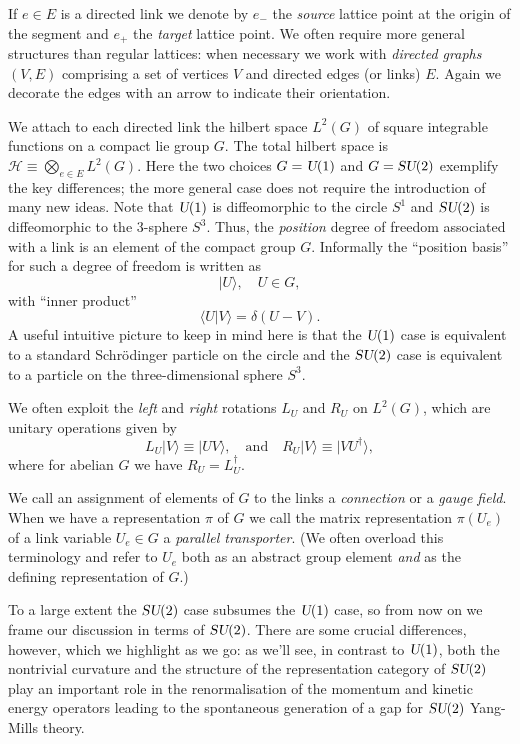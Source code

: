 \documentclass[twocolumn,lengthcheck,superscriptaddress]{revtex4-1}
\def\su2{\textsl{SU}(2)}
\def\uone{\textsl{U}(1)}
\theoremstyle{definition}
\theoremstyle{remark}
\begin{document}
If $e\in E$ is a directed link we denote by $e_-$ the \emph{source} lattice point at the origin of the segment and $e_+$ the \emph{target} lattice point. We often require more general structures than regular lattices: when necessary we work with \emph{directed graphs} $(V,E)$ comprising a set of vertices $V$ and directed edges (or links) $E$. Again we decorate the edges with an arrow to indicate their orientation. 

We attach to each directed link the hilbert space $L^2(G)$ of square integrable functions on a compact lie group $G$. The total hilbert space is $\mathcal{H}\equiv \bigotimes_{e\in E} L^2(G)$. Here the two choices $G=\uone$ and $G=\su2$ exemplify the key differences; the more general case does not require the introduction of many new ideas. Note that $\uone$ is diffeomorphic to the circle $S^1$ and $\su2$ is diffeomorphic to the $3$-sphere $S^3$. Thus, the \emph{position} degree of freedom associated with a link is an element of the compact group $G$. Informally the ``position basis'' for such a degree of freedom is written as  
\begin{equation}
	|U\rangle, \quad U\in G,
\end{equation}
with ``inner product''
\begin{equation}
	\langle U|V\rangle = \delta(U-V).
\end{equation}
A useful intuitive picture to keep in mind here is that the $\uone$ case is equivalent to a standard Schr\"odinger particle on the circle and the $\su2$ case is equivalent to a particle on the three-dimensional sphere $S^3$.

We often exploit the \emph{left} and \emph{right} rotations $L_U$ and $R_U$ on $L^2(G)$, which are unitary operations given by
\begin{equation}
	L_U|V\rangle \equiv |UV\rangle, \quad \text{and} \quad R_U|V\rangle \equiv |VU^\dag\rangle,
\end{equation} 
where for abelian $G$ we have $R_U = L_U^\dagger$.

We call an assignment of elements of $G$ to the links a \emph{connection} or a \emph{gauge field}. When we have a representation $\pi$ of $G$ we call the matrix representation $\pi(U_e)$ of a link variable $U_e\in G$ a \emph{parallel transporter}. (We often overload this terminology and refer to $U_e$ both as an abstract group element \emph{and} as the defining representation of $G$.)


To a large extent the $\su2$ case subsumes the $\uone$ case, so from now on we frame our discussion in terms of $\su2$. There are some crucial differences, however, which we highlight as we go: as we'll see, in contrast to $\uone$, both the nontrivial curvature and the structure of the representation category of $\su2$ play an important role in the renormalisation of the momentum and kinetic energy operators leading to the spontaneous generation of a gap for $\su2$ Yang-Mills theory.
\end{document}

